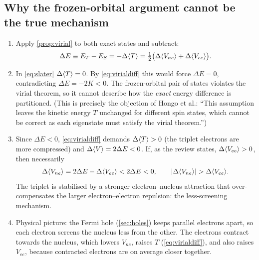 \subsection{Why the frozen-orbital argument cannot be the true mechanism}
\begin{enumerate}
  \item Apply \cref{prop:virial} to both exact states and subtract:
        \begin{equation}\label{eq:virialdiff}
          \Delta E\equiv E_T-E_S=-\Delta\langle T\rangle=\tfrac12\bigl(\Delta\langle V_{ne}\rangle+\Delta\langle V_{ee}\rangle\bigr).
        \end{equation}
  \item In \cref{eq:slater} $\Delta\langle T\rangle=0$. By \cref{eq:virialdiff} this would force $\Delta E=0$, contradicting
        $\Delta E=-2K<0$. The frozen-orbital pair of states violates the virial theorem, so it cannot
        describe how the \emph{exact} energy difference is partitioned. (This is precisely the objection of
        Hongo et al.: ``This assumption leaves the kinetic energy $T$ unchanged for different spin states,
        which cannot be correct as each eigenstate must satisfy the virial theorem.'')
  \item Since $\Delta E<0$, \cref{eq:virialdiff} demands $\Delta\langle T\rangle>0$ (the triplet electrons are more
        compressed) and $\Delta\langle V\rangle=2\Delta E<0$. If, as the review states, $\Delta\langle V_{ee}\rangle>0$, then necessarily
        \begin{equation}\label{eq:lessscreen}
          \Delta\ev{V_{ne}}=2\Delta E-\Delta\ev{V_{ee}}<2\Delta E<0,\qquad|\Delta\ev{V_{ne}}|>\Delta\ev{V_{ee}} .
        \end{equation}
        The triplet is stabilised by a stronger electron--nucleus attraction that over-compensates the
        larger electron--electron repulsion: the less-screening mechanism.
  \item Physical picture: the Fermi hole (\cref{sec:holes}) keeps parallel electrons apart, so each
        electron screens the nucleus less from the other. The electrons contract towards the nucleus,
        which lowers $V_{ne}$, raises $T$ (\cref{eq:virialdiff}), and also raises $V_{ee}$, because
        contracted electrons are on average closer together.
\end{enumerate}

